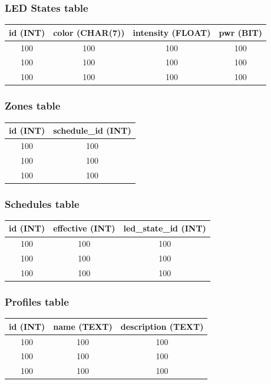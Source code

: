 \documentclass[onecolumn, draftclsnofoot,10pt, compsoc]{IEEEtran}
\begin{document}
			\subsubsection{LED States table}
				\begin{tabular}{ |c|c|c|c| }
					\hline
					id (INT) & color (CHAR(7)) & intensity (FLOAT) & pwr (BIT)\\
					\hline
					100 & 100 & 100 & 100 \\
					100 & 100 & 100 & 100 \\
					100 & 100 & 100 & 100 \\
					\hline
				\end{tabular}

			\subsubsection{Zones table}
				\begin{tabular}{ |c|c| }
					\hline
					id (INT) & schedule\_id (INT) \\
					\hline
					100 & 100 \\
					100 & 100 \\
					100 & 100 \\
					\hline
				\end{tabular}

			\subsubsection{Schedules table}
				\begin{tabular}{ |c|c|c| }
					\hline
					id (INT) & effective (INT) & led\_state\_id (INT) \\
					\hline
					100 & 100 & 100 \\
					100 & 100 & 100 \\
					100 & 100 & 100 \\
					\hline
				\end{tabular}

			\subsubsection{Profiles table}
				\begin{tabular}{ |c|c|c| }
					\hline
					id (INT) & name (TEXT) & description (TEXT) \\
					\hline
					100 & 100 & 100 \\
					100 & 100 & 100 \\
					100 & 100 & 100 \\
					\hline
				\end{tabular}
\end{document}
